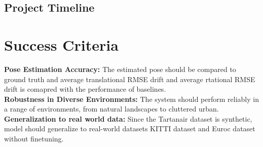 \documentclass[10pt,letterpaper]{article}
\begin{document}
\subsection*{Project Timeline}
\begin{table}[!h]
\centering
\tiny
\end{table}

\section*{Success Criteria}
\textbf{Pose Estimation Accuracy:} The estimated pose should be compared to ground truth and average translational RMSE drift and average rtational RMSE drift is comapred with the performance of baselines. \\
\textbf{Robustness in Diverse Environments:} The system should perform reliably in a range of environments, from natural landscapes to cluttered urban.
\textbf{Generalization to real world data:} Since the Tartanair dataset is synthetic, model should generalize to real-world datasets KITTI dataset and Euroc dataset without finetuning.

\end{document}
